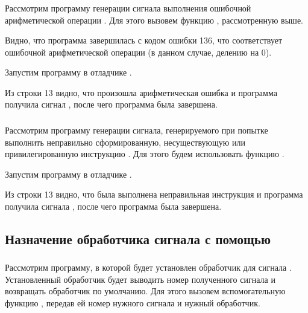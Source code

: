 \subsubsection{}

Рассмотрим программу генерации сигнала выполнения ошибочной арифметической операции . Для этого вызовем функцию , рассмотренную выше.


Видно, что программа завершилась с кодом ошибки 136, что соответствует ошибочной арифметической операции (в данном случае, делению на 0).

Запустим программу  в отладчике .


Из строки 13 видно, что произошла арифметическая ошибка и программа получила сигнал , после чего программа была завершена.


\subsubsection{}

Рассмотрим программу генерации сигнала, генерируемого при попытке выполнить неправильно сформированную, несуществующую или привилегированную инструкцию . Для этого будем использовать функцию .


Запустим программу  в отладчике .


Из строки 13 видно, что была выполнена неправильная инструкция и программа получила сигнала , после чего программа была завершена.

\subsection{Назначение обработчика сигнала с помощью }

\subsubsection{}

Рассмотрим программу, в которой будет установлен обработчик для сигнала . Установленный обработчик будет выводить номер полученного сигнала и возвращать обработчик по умолчанию. Для этого вызовем вспомогательную функцию , передав ей номер нужного сигнала и нужный обработчик.

